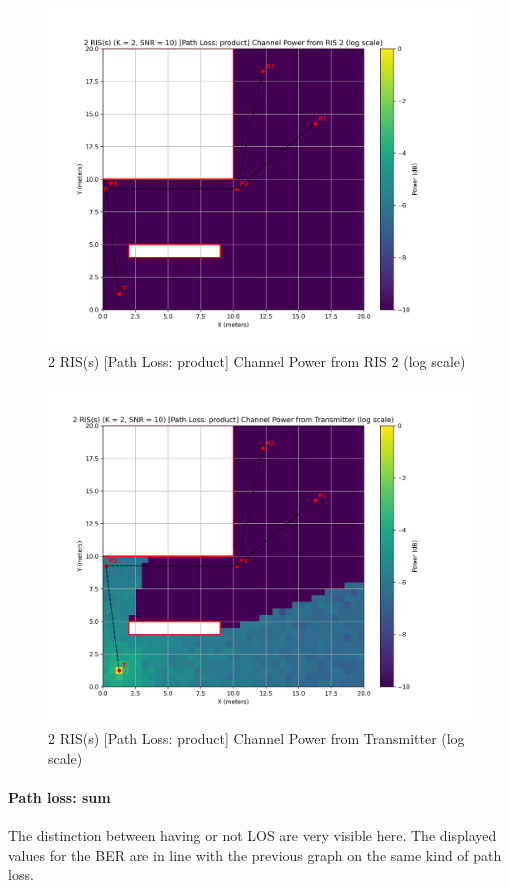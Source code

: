 \begin{figure}[H]
  \centering
  \includegraphics[width=0.7\linewidth]{imgs/heatmap-simulations/2 RIS(s) (K = 2, SNR = 10) [Path Loss_ product] Channel Power from RIS 2 (log scale).png}
  \caption{2 RIS(s) [Path Loss: product] Channel Power from RIS 2 (log scale)}
\end{figure}

\begin{figure}[H]
  \centering
  \includegraphics[width=0.7\linewidth]{imgs/heatmap-simulations/2 RIS(s) (K = 2, SNR = 10) [Path Loss_ product] Channel Power from Transmitter (log scale).png}
  \caption{2 RIS(s) [Path Loss: product] Channel Power from Transmitter (log scale)}
\end{figure}

\paragraph*{Path loss: sum}
The distinction between having or not LOS are very visible here. The displayed values for the BER are in line with the previous graph on the same kind of path loss.

